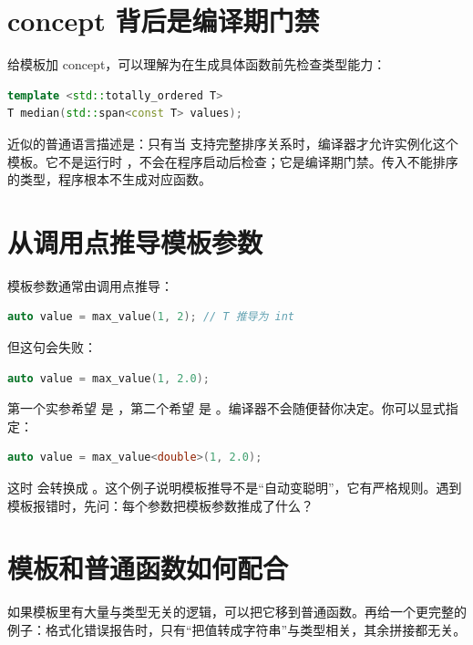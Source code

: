 \section{concept 背后是编译期门禁}

给模板加 concept，可以理解为在生成具体函数前先检查类型能力：

\begin{lstlisting}[language=C++,caption={有约束的模板}]
template <std::totally_ordered T>
T median(std::span<const T> values);
\end{lstlisting}

近似的普通语言描述是：只有当  支持完整排序关系时，编译器才允许实例化这个模板。它不是运行时 ，不会在程序启动后检查；它是编译期门禁。传入不能排序的类型，程序根本不生成对应函数。

\section{从调用点推导模板参数}

模板参数通常由调用点推导：

\begin{lstlisting}[language=C++,caption={模板参数推导}]
auto value = max_value(1, 2); // T 推导为 int
\end{lstlisting}

但这句会失败：

\begin{lstlisting}[language=C++,caption={两个实参推导出不同类型}]
auto value = max_value(1, 2.0);
\end{lstlisting}

第一个实参希望  是 ，第二个希望  是 。编译器不会随便替你决定。你可以显式指定：

\begin{lstlisting}[language=C++,caption={显式指定模板参数}]
auto value = max_value<double>(1, 2.0);
\end{lstlisting}

这时  会转换成 。这个例子说明模板推导不是“自动变聪明”，它有严格规则。遇到模板报错时，先问：每个参数把模板参数推成了什么？

\section{模板和普通函数如何配合}

如果模板里有大量与类型无关的逻辑，可以把它移到普通函数。再给一个更完整的例子：格式化错误报告时，只有“把值转成字符串”与类型相关，其余拼接都无关。

